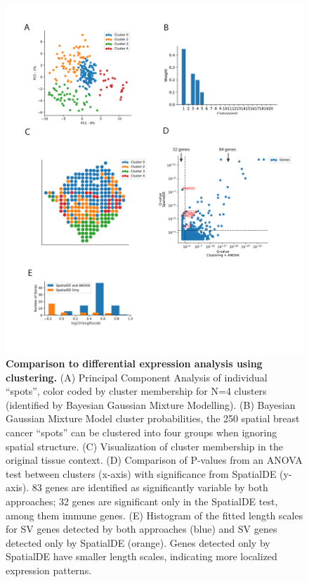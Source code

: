 \begin{figure}
    \centering
    \includegraphics[width=\textwidth]{"SuppFig2"}
    \caption[Comparison to differential expression analysis using clustering]{\textbf{Comparison to differential expression analysis using clustering.} (A)  Principal Component Analysis of individual “spots”, color coded by cluster membership for N=4 clusters (identified by Bayesian Gaussian Mixture Modelling). (B) Bayesian Gaussian Mixture Model cluster probabilities, the 250 spatial breast cancer “spots” can be clustered into four groups when ignoring spatial structure. (C) Visualization of cluster membership in the original tissue context. (D) Comparison of P-values from an ANOVA test between clusters (x-axis) with significance from SpatialDE (y-axis). 83 genes are identified as significantly variable by both approaches; 32 genes are significant only in the SpatialDE test, among them immune genes. (E)  Histogram of the fitted length scales for SV genes detected by both approaches (blue) and SV genes detected only by SpatialDE (orange). Genes detected only by SpatialDE have smaller length scales, indicating more localized expression patterns.}
    \label{fig:ss2}
\end{figure}

